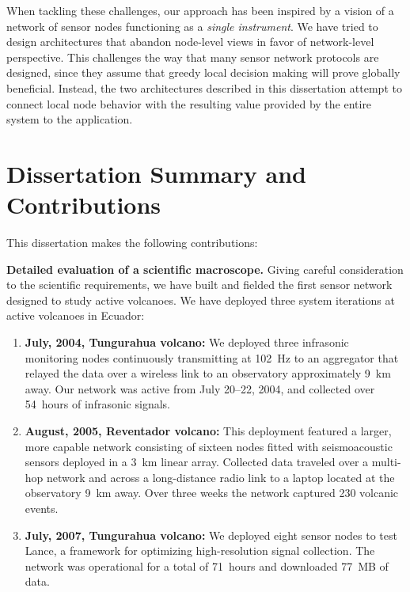 When tackling these challenges, our approach has been inspired by a vision of
a network of sensor nodes functioning as a \textit{single instrument}. We
have tried to design architectures that abandon node-level views in favor of
network-level perspective. This challenges the way that many sensor network
protocols are designed, since they assume that greedy local decision making
will prove globally beneficial. Instead, the two architectures described in
this dissertation attempt to connect local node behavior with the resulting
value provided by the entire system to the application.

\section{Dissertation Summary and Contributions}

This dissertation makes the following contributions:

\vspace*{0.1in}

\noindent \textbf{Detailed evaluation of a scientific macroscope.} Giving
careful consideration to the scientific requirements, we have built and
fielded the first sensor network designed to study active volcanoes. We have
deployed three system iterations at active volcanoes in Ecuador:

\begin{enumerate}

\item \textbf{July, 2004, Tungurahua volcano:} We deployed three infrasonic
monitoring nodes continuously transmitting at 102~Hz to an aggregator that
relayed the data over a wireless link to an observatory approximately 9~km
away. Our network was active from July 20--22, 2004, and collected over
54~hours of infrasonic signals.

\item \textbf{August, 2005, Reventador volcano:} This deployment featured a
larger, more capable network consisting of sixteen nodes fitted with
seismoacoustic sensors deployed in a 3~km linear array. Collected data
traveled over a multi-hop network and across a long-distance radio link to a
laptop located at the observatory 9~km away. Over three weeks the network
captured 230 volcanic events.

\item \textbf{July, 2007, Tungurahua volcano:} We deployed eight sensor nodes
to test Lance, a framework for optimizing high-resolution signal collection.
The network was operational for a total of 71~hours and downloaded 77~MB of
data.

\end{enumerate}

